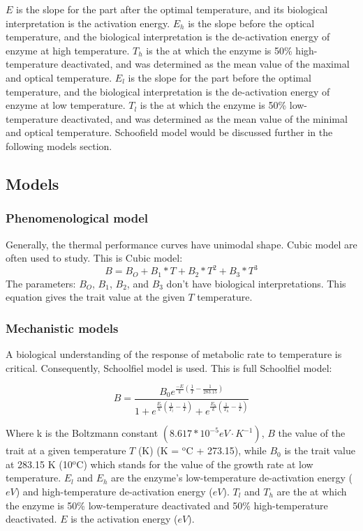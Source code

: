 \documentclass[11pt]{article}
\begin{document}
$E$ is the slope for the part after the optimal temperature, and its biological interpretation is the activation energy. $E_h$ is the slope before the optical temperature, and the biological interpretation is the de-activation energy of enzyme at high temperature. $T_h$ is the at which the enzyme is 50\% high-temperature deactivated, and was determined as the mean value of the maximal and optical temperature. $E_l$ is the slope for the part before the optimal temperature, and the biological interpretation is the de-activation energy of enzyme at low temperature. $T_l$ is the at which the enzyme is 50\% low-temperature deactivated, and was determined as the mean value of the minimal and optical temperature. Schoofield model would be discussed further in the following models section.

\subsection{Models}
\subsubsection{Phenomenological model}
Generally, the thermal performance curves have unimodal shape. Cubic model\citep{callaway1959model} are often used to study.  This is Cubic model:
\begin{equation}
B = B_O + B_1 * T + B_2 * T^2 + B_3 * T ^ 3
\end{equation}
The parameters: $B_O$, $B_1$, $B_2$, and $B_3$ don't have biological interpretations. This equation gives the trait value at the given $T$ temperature.

\subsubsection{Mechanistic models}
A biological understanding of the response of metabolic rate to temperature is critical. Consequently, Schoolfiel model is used. This is full Schoolfiel model\citep{schoolfield1981non}:

\begin{equation}
B = \frac{B_0 e^{\frac{-E}{k}(\frac{1}{T} - \frac{1}{283.15})}} {1 + e^{\frac{E_l} {k} (\frac{1}{T_l} - \frac{1}{T})} + e^{\frac{E_h}{k} (\frac{1}{T_h} - \frac{1}{T})}}
\end{equation}

Where k is the Boltzmann constant $(8.617 * 10^{-5} eV ⋅ K^{-1})$, $B$ the value of the trait at a given temperature $T$ (K)  (K = $^\text{o}$C + 273.15), while $B_0$ is the trait value at 283.15 K (10$^\text{o}$C) which stands for the value of the growth rate at low temperature. $E_l$ and $E_h$ are the enzyme's low-temperature de-activation energy ($eV$) and high-temperature de-activation energy ($eV$).  $T_l$ and $T_h$ are the at which the enzyme is 50\% low-temperature deactivated and 50\% high-temperature deactivated. $E$ is the activation energy ($eV$).
\end{document}

